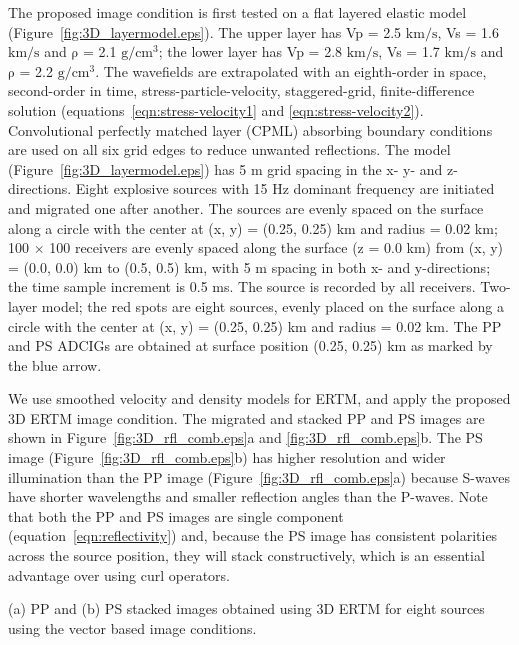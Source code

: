 \documentclass[manuscript,ulem,graphix,revised]{geophysics}
\begin{document}
The proposed image condition is first tested on a flat layered elastic model (Figure~\ref{fig:3D_layermodel.eps}). The upper layer has Vp = 2.5 $\mathrm{km/s}$,  Vs = 1.6 $\mathrm{km/s}$ and  $\mathrm{\rho}$ = 2.1 $\mathrm{g/cm^3}$; the lower layer has  Vp = 2.8 $\mathrm{km/s}$,  Vs = 1.7 $\mathrm{km/s}$ and  $\mathrm{\rho}$ = 2.2 $\mathrm{g/cm^3}$.
The wavefields are extrapolated with an eighth-order in space, second-order in time, stress-particle-velocity, staggered-grid, finite-difference solution (equations~\ref{eqn:stress-velocity1} and \ref{eqn:stress-velocity2}). Convolutional perfectly matched layer (CPML) absorbing boundary conditions \citep{komatitsch07} are used on all six grid edges to reduce unwanted reflections.
The model (Figure~\ref{fig:3D_layermodel.eps}) has 5 m grid spacing in the x- y- and z-directions. 
Eight explosive sources with 15 Hz dominant frequency are initiated and migrated one after another. The sources are evenly spaced on the surface along a circle with the center at (x, y) = (0.25, 0.25) km and radius = 0.02 km; 100 $\times$ 100 receivers are evenly spaced along the surface (z = 0.0 km) from  (x, y) = (0.0, 0.0) km to (0.5, 0.5) km, with 5 m spacing in both x- and y-directions; the time sample increment is 0.5 ms. The source is recorded by all receivers.
{
Two-layer model; the red spots are eight sources, evenly placed on the surface along a circle with the center at (x, y) = (0.25, 0.25) km and radius = 0.02 km. The PP and PS ADCIGs are obtained at surface position (0.25, 0.25) km as marked by the blue arrow.
}

We use smoothed velocity and density models for ERTM, and apply the proposed 3D ERTM image condition. The migrated and stacked PP and PS images are shown in Figure~\ref{fig:3D_rfl_comb.eps}a and \ref{fig:3D_rfl_comb.eps}b. The PS image (Figure~\ref{fig:3D_rfl_comb.eps}b) has higher resolution and wider illumination than the PP image (Figure~\ref{fig:3D_rfl_comb.eps}a) because S-waves have shorter wavelengths and smaller reflection angles than the P-waves. Note that both the PP and PS images are single component (equation~\ref{eqn:reflectivity}) and, because the PS image has consistent polarities across the source position, they will stack constructively, which is an essential advantage over using curl operators. 

{
(a) PP and (b) PS stacked images obtained using 3D ERTM for eight sources using the vector based image conditions.
}
\end{document}
